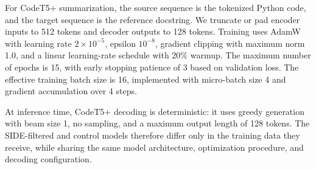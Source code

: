 For CodeT5+ summarization, the source sequence is the tokenized Python code, and the target sequence is the reference docstring. We truncate or pad encoder inputs to 512 tokens and decoder outputs to 128 tokens. Training uses AdamW with learning rate \(2\times10^{-5}\), epsilon \(10^{-8}\), gradient clipping with maximum norm 1.0, and a linear learning-rate schedule with 20\% warmup. The maximum number of epochs is 15, with early stopping patience of 3 based on validation loss. The effective training batch size is 16, implemented with micro-batch size 4 and gradient accumulation over 4 steps.

At inference time, CodeT5+ decoding is deterministic: it uses greedy generation with beam size 1, no sampling, and a maximum output length of 128 tokens. The SIDE-filtered and control models therefore differ only in the training data they receive, while sharing the same model architecture, optimization procedure, and decoding configuration.